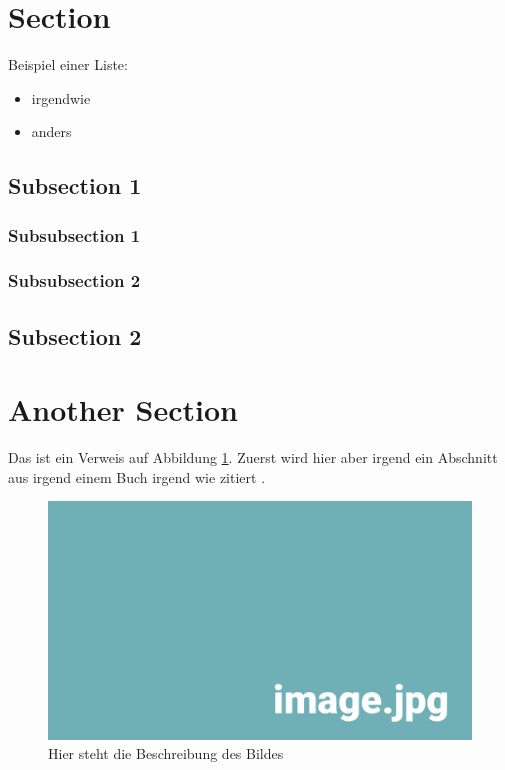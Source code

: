 
\section{Section}

Beispiel einer Liste:

\begin{itemize} 
	\item irgendwie 
	\item anders
\end{itemize}


\subsection{Subsection 1}

\subsubsection{Subsubsection 1}

\subsubsection{Subsubsection 2}


\subsection{Subsection 2}
 

\section{Another Section}

Das ist ein Verweis auf Abbildung \ref{pic:DasBild}. Zuerst wird hier aber irgend ein Abschnitt aus irgend einem Buch irgend wie zitiert \parencite[S. 42--66]{plato_staat_2017}. \\

\begin{figure}[htbp]
	\centering

	\includegraphics[width=\textwidth]{img/image.jpg}

	\caption{Hier steht die Beschreibung des Bildes}
	\label{pic:DasBild}
\end{figure}
